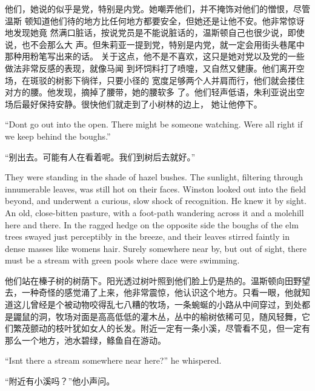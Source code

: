 \begin{paracol}{2}
\switchcolumn

他们，她说的似乎是党，特别是内党。她嘲弄他们，并不掩饰对他们的憎恨，尽管温斯
顿知道他们待的地方比任何地方都要安全，但她还是让他不安。他非常惊讶地发现她竟
然满口脏话，按说党员是不能说脏话的，温斯顿自己也很少说，即使说，也不会那么大
声。但朱莉亚一提到党，特别是内党，就一定会用街头巷尾中那种用粉笔写出来的话。
关于这点，他不是不喜欢，这只是她对党以及党的一些做法非常反感的表现，就像马闻
到坏饲料打了喷嚏，又自然又健康。他们离开空场，在斑驳的树影下徜徉，只要小径的
宽度足够两个人并肩而行，他们就会搂住对方的腰。他发现，摘掉了腰带，她的腰软多
了。他们轻声低语，朱利亚说出空场后最好保持安静。很快他们就走到了小树林的边上，
她让他停下。

\switchcolumn*

``Don\textquotesingle t go out into the open. There might be someone
watching. We\textquotesingle re all right if we keep behind the boughs.''

\switchcolumn

``别出去。可能有人在看着呢。我们到树后去就好。''

\switchcolumn*

They were standing in the shade of hazel bushes. The sunlight, filtering
through innumerable leaves, was still hot on their faces. Winston looked
out into the field beyond, and underwent a curious, slow shock of
recognition. He knew it by sight. An old, close-bitten pasture, with a
foot-path wandering across it and a molehill here and there. In the
ragged hedge on the opposite side the boughs of the elm trees swayed
just perceptibly in the breeze, and their leaves stirred faintly in
dense masses like women\textquotesingle s hair. Surely somewhere near
by, but out of sight, there must be a stream with green pools where dace
were swimming.

\switchcolumn

他们站在榛子树的树荫下。阳光透过树叶照到他们脸上仍是热的。温斯顿向田野望去，一种奇怪的感觉涌了上来，他非常震惊，他认识这个地方。只看一眼，他就知道这儿曾经是个被动物咬得乱七八糟的牧场，一条蜿蜒的小路从中间穿过，到处都是鼹鼠的洞，牧场对面是高高低低的灌木丛，丛中的榆树依稀可见，随风轻舞，它们繁茂颤动的枝叶犹如女人的长发。附近一定有一条小溪，尽管看不见，但一定有那么一个地方，池水碧绿，鲦鱼自在游动。

\switchcolumn*

``Isn\textquotesingle t there a stream somewhere near here?'' he
whispered.

\switchcolumn

``附近有小溪吗？''他小声问。


\end{paracol}

